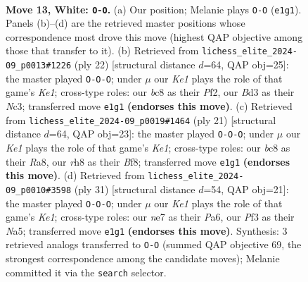 \documentclass[11pt]{article}
\begin{document}
\clearpage

\begin{figure}[p]\centering
\begin{subfigure}{0.46\textwidth}\centering
\resizebox{\linewidth}{!}{%
\newchessgame
\chessboard[
  setfen={r1b1kb1r/p3n1pp/2pp4/5p2/8/N2B1P2/PPP3PP/R1B1K2R w KQkq - 0 13},
  showmover=false,
  pgfstyle=straightmove, color=movearrow, markmove={e1-g1}
]}
\caption{}
\end{subfigure}\hfill
\begin{subfigure}{0.46\textwidth}\centering
\resizebox{\linewidth}{!}{%
\newchessgame
\chessboard[
  setfen={r3k2r/1pB1n1pp/p1n1p3/5b2/4p3/2N5/PPP2PPP/R3KB1R w KQkq - 0 12},
  showmover=false,
  pgfstyle=straightmove, color=movearrow, markmove={e1-c1}
]}
\caption{}
\end{subfigure}
\\[4pt]
\begin{subfigure}{0.46\textwidth}\centering
\resizebox{\linewidth}{!}{%
\newchessgame
\chessboard[
  setfen={r3kbnr/1pp2ppp/p7/3P1b2/P1B5/2N5/1P3PPP/R1B1K2R b KQkq - 0 11},
  showmover=false,
  pgfstyle=straightmove, color=movearrow, markmove={e8-c8}
]}
\caption{}
\end{subfigure}\hfill
\begin{subfigure}{0.46\textwidth}\centering
\resizebox{\linewidth}{!}{%
\newchessgame
\chessboard[
  setfen={r3kb1r/5ppp/p3b3/np2p3/8/2P1N3/PP2BPPP/R1B1K2R b KQkq - 3 16},
  showmover=false,
  pgfstyle=straightmove, color=movearrow, markmove={e8-c8}
]}
\caption{}
\end{subfigure}
\caption{\textbf{Move 13, White: \texttt{O-O}.} (a) Our position; Melanie plays \texttt{O-O} (\texttt{e1g1}). Panels (b)--(d) are the retrieved master positions whose correspondence most drove this move (highest QAP objective among those that transfer to it). (b) Retrieved from \texttt{lichess\_elite\_2024-09\_p0013\#1226} (ply 22) [structural distance $d$=64, QAP obj=25]: the master played \texttt{O-O-O}; under $\mu$ our \emph{Ke1} plays the role of that game's \emph{Ke1}; cross-type roles: our \emph{b}c8 as their \emph{P}f2, our \emph{B}d3 as their \emph{N}c3; transferred move \texttt{e1g1} \textbf{(endorses this move)}. (c) Retrieved from \texttt{lichess\_elite\_2024-09\_p0019\#1464} (ply 21) [structural distance $d$=64, QAP obj=23]: the master played \texttt{O-O-O}; under $\mu$ our \emph{Ke1} plays the role of that game's \emph{Ke1}; cross-type roles: our \emph{b}c8 as their \emph{R}a8, our \emph{r}h8 as their \emph{B}f8; transferred move \texttt{e1g1} \textbf{(endorses this move)}. (d) Retrieved from \texttt{lichess\_elite\_2024-09\_p0010\#3598} (ply 31) [structural distance $d$=54, QAP obj=21]: the master played \texttt{O-O-O}; under $\mu$ our \emph{Ke1} plays the role of that game's \emph{Ke1}; cross-type roles: our \emph{n}e7 as their \emph{P}a6, our \emph{P}f3 as their \emph{N}a5; transferred move \texttt{e1g1} \textbf{(endorses this move)}. Synthesis: 3 retrieved analogs transferred to \texttt{O-O} (summed QAP objective 69, the strongest correspondence among the candidate moves); Melanie committed it via the \texttt{search} selector.}
\label{fig:thought-m24}
\end{figure}
\end{document}
